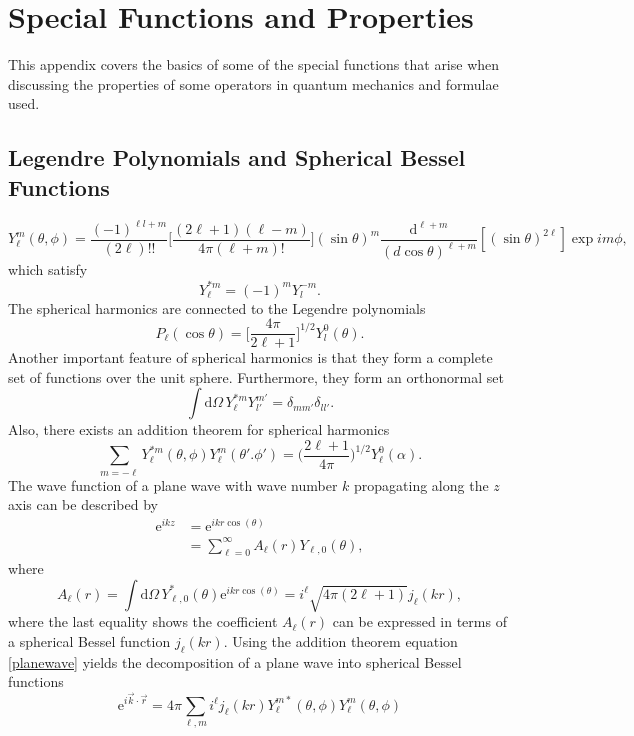 \chapter{Special Functions and Properties}
This appendix covers the basics of some of the special functions that arise when discussing the properties of some operators in quantum mechanics and formulae used.
\section{Legendre Polynomials and Spherical Bessel Functions}\label{app:Bessel}
\begin{equation}
	Y_{\ell}^m(\theta,\phi) = \frac{(-1)^{{\ell}l+m}}{(2\ell)!!}\bigg[ \frac{(2\ell+1)(\ell-m)}{4\pi(\ell+m)!}\bigg](\sin\theta)^m\frac{\text{d}^{\ell+m}}{(d\cos\theta)^{\ell+m}}[(\sin\theta)^{2\ell}]\exp{i m\phi},
\end{equation}
which satisfy
\begin{equation}
	Y_\ell^{*m}=(-1)^m Y_{l}^{-m}.
\end{equation}
The spherical harmonics are connected to the Legendre polynomials
\begin{equation}
	P_\ell(\cos\theta) = \bigg[ \frac{4\pi}{2\ell+1} \bigg]^{1/2}Y_{l}^0(\theta).
\end{equation}
Another important feature of spherical harmonics is that they form a complete set of functions over the unit sphere. Furthermore, they form an orthonormal set
\begin{equation}\label{orthset}
	\int \text{d}\Omega \, Y_\ell^{*m} Y_{l'}^{m'} = \delta_{mm'}\delta_{ll'}.
\end{equation}
Also, there exists an addition theorem for spherical harmonics
\begin{equation}\label{addition}
	\sum_{m=-\ell} Y_\ell^{*m}(\theta,\phi)Y_\ell^{m}(\theta'.\phi') = \bigg( \frac{2\ell+1}{4\pi}\bigg)^{1/2}Y_\ell^0(\alpha).
\end{equation}
The wave function of a plane wave with wave number $k$ propagating along the $z$ axis can be described by
\begin{align} \label{planewave}
	\text{e}^{ikz}  &= \text{e}^{ikr \cos(\theta)}  \\
	&= \sum_{\ell=0}^\infty A_\ell(r)Y_{\ell,0}(\theta),
\end{align}
where
\begin{equation} \label{besselcoef}
	A_\ell(r) = \int \text{d}\Omega \, Y_{\ell,0}^*(\theta)\text{e}^{ikr\cos(\theta)}  = i^\ell\sqrt{4\pi(2\ell+1)}j_\ell(kr),
\end{equation}
where the last equality shows the coefficient $A_\ell(r)$ can be expressed in terms of a spherical Bessel function $j_\ell(kr)$. Using the addition theorem equation \eqref{planewave} yields the decomposition of a plane wave into spherical Bessel functions
\begin{equation} \label{sphericalbesseldecomp}
	\text{e}^{i\vec{k}\cdot\vec{r}} = 4\pi \sum_{\ell,m}i^\ell j_\ell(kr)Y_\ell^{m*}(\theta,\phi)Y_\ell^{m}(\theta,\phi)
\end{equation}
